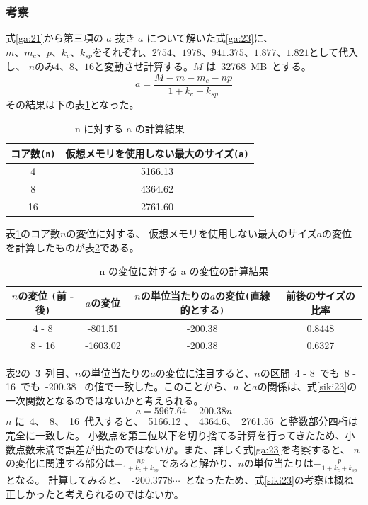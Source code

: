 \documentclass[10pt]{jarticle}
\begin{document}
\subsubsection{考察}
%
式\ref{ga:21}から第三項の $ a $ 抜き $ a $ について解いた式\ref{ga:23}に、
$ m、m_{c}、p、k_{c}、k_{sp} $をそれぞれ、$ 2754、1978、941.375、1.877、1.821 $として代入し、
$ n $のみ$ 4、8、16 $と変動させ計算する。$ M $ は\ 32768\ MB\ とする。
\begin{equation}
	a = \frac{M - m - m_{c} - np}{1 + k_{c} + k_{sp}}\label{ga:23}
\end{equation}
その結果は下の表\ref{table:23}となった。
\begin{table}[htbp]
	\centering
	\caption{ n に対する a の計算結果}
	\label{table:23}
	\begin{tabular}{|c|c|}
		\hline
		コア数\verb|(n)| & 仮想メモリを使用しない最大のサイズ\verb|(a)|\\
		\hline
		4  & 5166.13 \\
		8  & 4364.62 \\
		16 & 2761.60 \\
		\hline
	\end{tabular}
\end{table}
表\ref{table:23}のコア数$ n $の変位に対する、 
仮想メモリを使用しない最大のサイズ$ a $の変位
を計算したものが表\ref{table:23h}である。
\begin{table}[htbp]
	\centering
	\caption{ n の変位に対する a の変位の計算結果}
	\label{table:23h}
	\begin{tabular}{|c|c|c|c|}
		\hline
		$ n $の変位 \verb|(|前 - 後\verb|)| & $ a $の変位 & $ n $の単位当たりの$ a $の変位\verb|(|直線的とする\verb|)| & 前後のサイズの比率\\
		\hline
		4 - 8  & -801.51 & -200.38 & 0.8448\\
		8 - 16 & -1603.02 & -200.38 & 0.6327\\
		\hline
	\end{tabular}
\end{table}
表\ref{table:23h}の\ 3\ 列目、$ n $の単位当たりの$ a $の変位に注目すると、$ n $の区間\ 4 - 8\ 
でも\ 8 - 16\ でも\ -200.38 \ の値で一致した。このことから、$ n $ と$ a $の関係は、式\ref{siki23}の一次関数となるのではないかと考えられる。
\begin{equation}
	a = 5967.64 - 200.38n \label{siki23}
\end{equation}
$ n $ に\ 4、\ 8、\ 16\ 代入すると、\ 5166.12 、\ 4364.6、\ 2761.56\ と整数部分四桁は完全に一致した。
小数点を第三位以下を切り捨てる計算を行ってきたため、小数点数未満で誤差が出たのではないか。また、詳しく式\ref{ga:23}を考察すると、
$ n $の変化に関連する部分は$-\frac{np}{1 + k_{c} + k_{sp}}$であると解かり、$ n $の単位当たりは$-\frac{p}{1 + k_{c} + k_{sp}}$となる。
計算してみると、\ -200.3778$\cdots$\ となったため、式\ref{siki23}の考察は概ね正しかったと考えられるのではないか。
%
\end{document}
